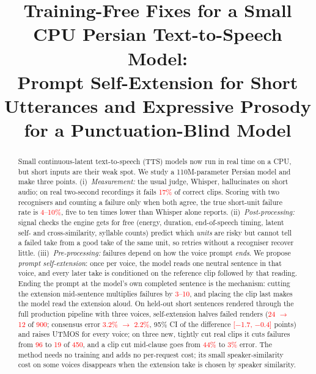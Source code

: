 \documentclass[conference]{IEEEtran}
\newcommand{\RES}[1]{\textcolor{red}{#1}}
\begin{document}
\title{Training-Free Fixes for a Small CPU Persian Text-to-Speech Model:\\
Prompt Self-Extension for Short Utterances and Expressive Prosody for a Punctuation-Blind Model}

\author{
}

\maketitle

\begin{abstract}
Small continuous-latent text-to-speech (TTS) models now run in real time on a CPU, but short inputs are their
weak spot. We study a 110M-parameter Persian model and make three points. (i)~\emph{Measurement:} the usual
judge, Whisper, hallucinates on short audio; on real two-second recordings it fails \RES{17\%} of correct
clips. Scoring with two recognisers and counting a failure only when both agree, the true short-unit failure
rate is \RES{4--10\%}, five to ten times lower than Whisper alone reports. (ii)~\emph{Post-processing:}
signal checks the engine gets for free (energy, duration, end-of-speech timing, latent self- and
cross-similarity, syllable counts) predict which \emph{units} are risky but cannot tell a failed take from a
good take of the same unit, so retries without a recogniser recover little. (iii)~\emph{Pre-processing:}
failures depend on how the voice prompt \emph{ends}. We propose \emph{prompt self-extension}: once per
voice, the model reads one neutral sentence in that voice, and every later take is conditioned on the
reference clip followed by that reading. Ending the prompt at the model's own completed sentence is the
mechanism: cutting the extension mid-sentence multiplies failures by \RES{3--10}, and placing the clip last
makes the model read the extension aloud. On held-out short sentences rendered through the full production
pipeline with three voices, self-extension halves failed renders (\RES{24 $\to$ 12} of \RES{900}; consensus
error \RES{3.2\% $\to$ 2.2\%}, 95\% CI of the difference \RES{[$-$1.7, $-$0.4]} points) and raises UTMOS for
every voice; on three new, tightly cut real clips it cuts failures from \RES{96} to \RES{19} of \RES{450},
and a clip cut mid-clause goes from \RES{44\%} to \RES{3\%} error. The method needs no training and adds no per-request cost; its small
speaker-similarity cost on some voices disappears when the extension take is chosen by speaker similarity.

\end{abstract}
\end{document}
